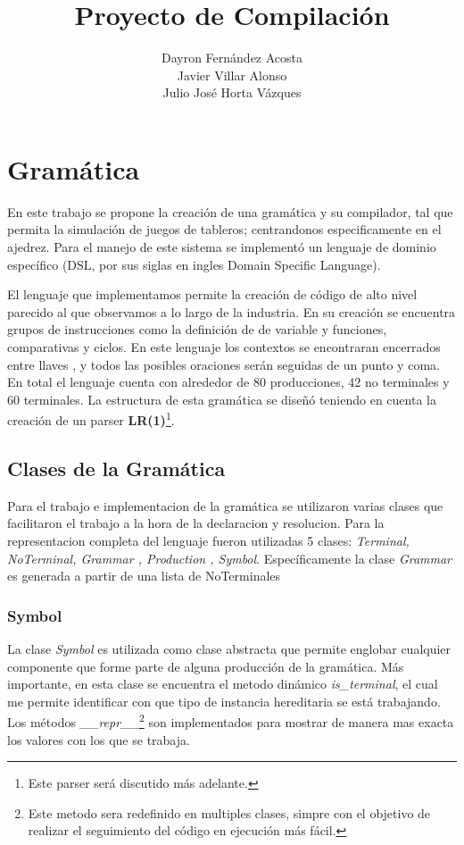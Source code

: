 \documentclass[10pt,a4paper]{article}
\author{Dayron Fernández Acosta\\ Javier Villar Alonso \\ Julio José Horta Vázques}
\title{Proyecto de Compilación}
\begin{document}
\maketitle
\newpage
\makeindex

\section{Gramática}
En este trabajo se propone la creación de una gramática y su compilador, tal que permita la simulación de juegos de tableros; centrandonos especificamente en el ajedrez. Para el manejo de este sistema se implementó un lenguaje de dominio específico (DSL, por sus siglas en ingles Domain Specific Language).

El lenguaje que implementamos permite la creación de código de alto nivel parecido al que observamos a lo largo de la industria. En su creación se encuentra grupos de instrucciones como la definición de de variable y funciones, comparativas y ciclos. En este lenguaje los contextos se encontraran encerrados entre llaves , y todos las posibles oraciones serán seguidas de un punto y coma. En total el lenguaje cuenta con alrededor de 80 producciones, 42 no terminales y 60 terminales. La estructura de esta gramática se diseñó teniendo en cuenta la creación de un parser \textbf{LR(1)}\footnote{Este parser será discutido más adelante.}.
\subsection{Clases de la Gramática}
Para el trabajo e implementacion de la gramática se utilizaron varias clases que facilitaron el trabajo a la hora de la declaracion y resolucion. Para la representacion completa del lenguaje fueron utilizadas 5 clases: \textit{Terminal, NoTerminal, Grammar , Production , Symbol}. Específicamente la clase \textit{Grammar} es generada a partir de una lista de NoTerminales

\subsubsection{Symbol}
La clase \textit{Symbol} es utilizada como clase abstracta que permite englobar cualquier componente que forme parte de alguna producción de la gramática. Más importante, en esta clase se encuentra el metodo dinámico \textit{is\_terminal}, el cual me permite identificar con que tipo de instancia hereditaria se está trabajando. Los métodos \textit{\_\_repr\_\_}\footnote{Este metodo sera redefinido en multiples clases, simpre con el objetivo de realizar el seguimiento del código en ejecución más fácil.} son implementados para mostrar de manera mas exacta los valores con los que se trabaja.
\end{document}
